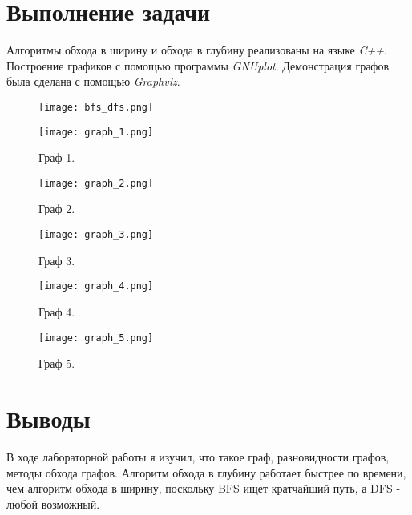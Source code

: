 \documentclass[12pt, a4paper]{report}
\begin{document}
	\newpage

	\section*{Выполнение задачи}
	Алгоритмы обхода в ширину и обхода в глубину реализованы на языке \textit{C++}. Построение графиков с помощью программы \textit{GNUplot}. Демонстрация графов была сделана с помощью \textit{Graphviz}. \par

	\newpage
	\vfill

	\begin{figure}
		\texttt{[image: bfs\_dfs.png]}
	\end{figure}

	\begin{figure}[h]
		\centering
		\texttt{[image: graph\_1.png]}
		\caption{Граф 1.}
	\end{figure}
	\begin{figure}[h]
		\centering
		\texttt{[image: graph\_2.png]}
		\caption{Граф 2.}
	\end{figure}
	\begin{figure}[h]
		\centering
		\texttt{[image: graph\_3.png]}
		\caption{Граф 3.}
	\end{figure}
	\begin{figure}[h]
		\centering
		\texttt{[image: graph\_4.png]}
		\caption{Граф 4.}
	\end{figure}
	\begin{figure}[h]
		\centering
		\texttt{[image: graph\_5.png]}
		\caption{Граф 5.}
	\end{figure}

	\vfill
	\clearpage

	\section*{Выводы}
	В ходе лабораторной работы я изучил, что такое граф, разновидности графов, методы обхода графов. Алгоритм обхода в глубину работает быстрее по времени, чем алгоритм обхода в ширину, поскольку BFS ищет кратчайший путь, а DFS - любой возможный. 
\end{document}
